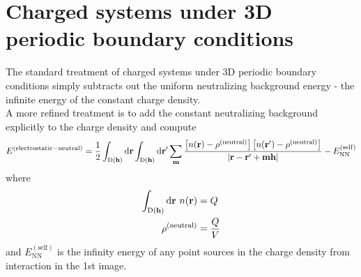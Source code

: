 \documentclass[paper=a4, fontsize=11pt]{article} %
\numberwithin{equation}{section} %
\numberwithin{figure}{section} %
\numberwithin{table}{section} %
\newcommand{\bh}{{\bf{h}}}
\newcommand{\bm}{{\bf{m}}}
\newcommand{\br}{{\bf{r}}}
\newcommand{\rNN}{{\mathrm{NN}}}
\newcommand{\rself}{{\mathrm{self}}}
\newcommand{\rd}{{\mathrm{d}}}
\newcommand{\rD}{{\mathrm{D}}}
\begin{document}
\newpage
\section{Charged systems under 3D periodic boundary conditions}\label{App:c3D}
The standard treatment of charged systems under 3D periodic boundary conditions simply subtracts out the uniform neutralizing background energy - the infinite energy of the constant charge density.\\

A more refined treatment is to add the constant neutralizing background explicitly to the charge density and compute
\begin{equation}\label{eq:m1}
\begin{split}
E^{(\mathrm{electrostatic-neutral})}
&= \frac{1}{2}\int_{\rD(\bh)} \rd \br \int_{\rD(\bh)}\rd \br'\sum_\bm \frac{\left[n(\br)-\rho^{(\mathrm{neutral})}\right]\left[n(\br')-\rho^{(\mathrm{neutral})}\right]}{|\br-\br'+\bm\bh|} - E_{\rNN}^{(\rself)}\\
\end{split}
\end{equation}
where 
\begin{equation}
\begin{split}
\int_{\rD(\bh)} \rd \br\ n(\br) &= Q \\
\rho^{(\mathrm{neutral})} &= \frac{Q}{V}
\end{split}
\end{equation}
and $E_{\rNN}^{(\rself)}$ is the infinity energy of any point sources in the charge density from interaction in the 1st image.\\
\end{document}
